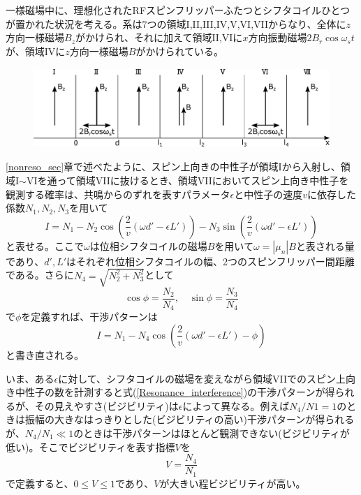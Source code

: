 一様磁場中に、理想化されたRFスピンフリッパーふたつとシフタコイルひとつが置かれた状況を考える。系は7つの領域I,II,III,IV,V,VI,VIIからなり、全体に$z$方向一様磁場$B_z$がかけられ、それに加えて領域II,VIに$x$方向振動磁場$2B_r\cos\omega_s t$が、領域IVに$z$方向一様磁場$B$がかけられている。
\begin{figure}[h]
\centering
\includegraphics[height=3cm]{resonance/whatwhyhow/Resonance_why_setting.pdf}
\end{figure}

\ref{nonreso_sec}章で述べたように、スピン上向きの中性子が領域Iから入射し、領域I$\sim$VIを通って領域VIIに抜けるとき、領域VIIにおいてスピン上向き中性子を観測する確率は、共鳴からのずれを表すパラメータ$\epsilon$と中性子の速度$v$に依存した係数$N_1,N_2,N_3$を用いて
\begin{equation}
I=N_1-N_2\cos\left(\frac{2}{v}(\omega d'-\epsilon L')\right) -N_3\sin\left(\frac{2}{v}(\omega d'-\epsilon L')\right)
\end{equation}
と表せる。ここで$\omega$は位相シフタコイルの磁場$B$を用いて$\omega=|\mu_n|B$と表される量であり、$d',L'$はそれぞれ位相シフタコイルの幅、2つのスピンフリッパー間距離である。さらに$N_4=\sqrt{N_2^2+N_3^2}$として
\begin{equation}
\cos \phi=\frac{N_2}{N_4}, \quad \sin \phi=\frac{N_3}{N_4}
\end{equation}
で$\phi$を定義すれば、干渉パターンは
\begin{equation}
I=N_1-N_4\cos\left(\frac{2}{v}(\omega d'-\epsilon L')-\phi\right)\label{Resonance_interference}
\end{equation}
と書き直される。

いま、ある$\epsilon$に対して、シフタコイルの磁場を変えながら領域VIIでのスピン上向き中性子の数を計測すると式(\ref{Resonance_interference})の干渉パターンが得られるが、その見えやすさ(ビジビリティ)は$\epsilon$によって異なる。例えば$N_4/N1=1$のときは振幅の大きなはっきりとした(ビジビリティの高い)干渉パターンが得られるが、$N_4/N_1 \ll 1$のときは干渉パターンはほとんど観測できない(ビジビリティが低い)。そこでビジビリティを表す指標$V$を
\begin{equation}
V=\frac{N_4}{N_1}
\end{equation}
で定義すると、$0 \le V \le 1$であり、$V$が大きい程ビジビリティが高い。

